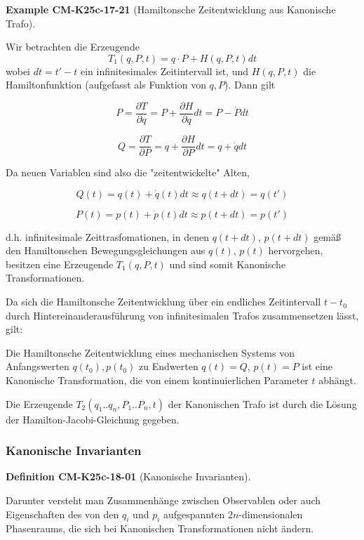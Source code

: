 \documentclass[10pt, letterpaper]{article}
\newcommand{\CustomHeading}[3]{%
  \par\medskip\noindent%
  \textbf{#1 #2} \textnormal{(#3)}.\enskip%
}
\newenvironment{DEF}[2]{\begin{unitbox}\CustomHeading{Definition}{#1}{#2}}{\end{unitbox}}
\newenvironment{EXA}[2]{\begin{unitbox}\CustomHeading{Example}{#1}{#2}}{\end{unitbox}}
\begin{document}
\begin{EXA}{CM-K25c-17-21}{Hamiltonsche Zeitentwicklung aus Kanonische Trafo}
Wir betrachten die Erzeugende 
$$T_1(q,P,t) = q\cdot P + H(q,P,t)dt$$ 
wobei $dt = t'-t$ ein infinitesimales Zeitintervall ist, und $H(q,P,t)$ die Hamiltonfunktion (aufgefasst als Funktion von $q,P$). Dann gilt

\[
P = \frac{\partial T}{\partial q} = P + \frac{\partial H}{\partial q}dt = P - \dot{P}dt
\]

\[
Q = \frac{\partial T}{\partial P} = q + \frac{\partial H}{\partial P}dt = q + \dot{q}dt
\]

Da neuen Variablen sind also die "zeitentwickelte" Alten,

\[
Q(t) = q(t) + \dot{q}(t)dt \approx q(t+dt) = q(t')
\]

\[
P(t) = p(t) + \dot{p}(t)dt \approx p(t+dt) = p(t')
\]

d.h. infinitesimale Zeittrasfomationen, in denen $q(t+dt)$, $p(t+dt)$ gemäß den Hamiltonschen Bewegungsgleichungen aus $q(t)$, $p(t)$ hervorgehen, besitzen eine Erzeugende $T_1(q,P,t)$ und sind somit Kanonische Transformationen.

Da sich die Hamiltonsche Zeitentwicklung über ein endliches Zeitintervall $t-t_0$ durch Hintereinanderausführung von infinitesimalen Trafos zusammensetzen lässt, gilt:

Die Hamiltonsche Zeitentwicklung eines mechanischen Systems von Anfangswerten $q(t_0), p(t_0)$ zu Endwerten $q(t) = Q$, $p(t) = P$ ist eine Kanonische Transformation, die von einem kontinuierlichen Parameter $t$ abhängt.


Die Erzeugende $T_2(q_1..q_n, P_1..P_n,t)$ der Kanonischen Trafo ist durch die Lösung der Hamilton-Jacobi-Gleichung gegeben.
\end{EXA}





\pagebreak


\subsubsection*{Kanonische Invarianten}

\begin{DEF}{CM-K25c-18-01}{Kanonische Invarianten}
Darunter versteht man Zusammenhänge zwischen Observablen oder auch Eigenschaften des von den $q_i$ und $p_i$ aufgespannten $2n$-dimensionalen Phasenraums, die sich bei Kanonischen Transformationen nicht ändern.
\end{DEF}
\end{document}
